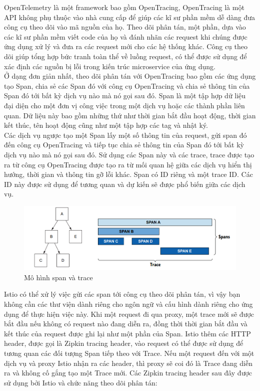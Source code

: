 \documentclass[14pt,a4paper]{book}
\begin{document}
{{		OpenTelemetry là một framework bao gồm OpenTracing, OpenTracing là một API không phụ thuộc vào nhà cung cấp để giúp các kĩ sư phần mềm dễ dàng đưa công cụ theo dõi vào mã nguồn của họ. Theo dõi phân tán, một phần, dựa vào các kĩ sư phần mềm viết code của họ và đánh nhãn các request khi chúng được ứng dụng xử lý và đưa ra các request mới cho các hệ thống khác. Công cụ theo dõi giúp tổng hợp bức tranh toàn thể về luồng request, có thể được sử dụng để xác định các nguồn bị lỗi trong kiến trúc microservice của ứng dụng.\\
		
		Ở dạng đơn giản nhất, theo dõi phân tán với OpenTracing bao gồm các ứng dụng tạo Span, chia sẻ các Span đó với công cụ OpenTracing và chia sẻ thông tin của Span đó tới bất kỳ dịch vụ nào mà nó gọi sau đó. Span là một tập hợp dữ liệu đại diện cho một đơn vị công việc trong một dịch vụ hoặc các thành phần liên quan. Dữ liệu này bao gồm những thứ như thời gian bắt đầu hoạt động, thời gian kết thúc, tên hoạt động cũng như một tập hợp các tag và nhật ký.\\
		
		Các dịch vụ ngược tạo một Span lấy một số thông tin của request, gửi span đó đến công cụ OpenTracing và tiếp tục chia sẻ thông tin của Span đó tới bất kỳ dịch vụ nào mà nó gọi sau đó. Sử dụng các Span này và các trace, trace được tạo ra từ công cụ OpenTracing được tạo ra từ mối quan hệ giữa các dịch vụ hiển thị hướng, thời gian và thông tin gỡ lỗi khác. Span có ID riêng và một trace ID. Các ID này được sử dụng để tương quan và dự kiến sẽ được phổ biến giữa các dịch vụ.
		
		\begin{figure}[h]
			\centering
			\includegraphics[width=1\linewidth]{Pics/2.3.2-p2}
			\caption{Mô hình span và trace}
			\label{fig:2}
		\end{figure}
		
		Istio có thể xử lý việc gửi các span tới công cụ theo dõi phân tán, vì vậy bạn không cần các thư viện dành riêng cho ngôn ngữ và cấu hình dành riêng cho ứng dụng để thực hiện việc này. Khi một request đi qua proxy, một trace mới sẽ được bắt đầu nếu không có request nào đang diễn ra, đồng thời thời gian bắt đầu và kết thúc của request được ghi lại như một phần của Span. Istio thêm các HTTP header, được gọi là Zipkin tracing header, vào request có thể được sử dụng để tương quan các đối tượng Span tiếp theo với Trace. Nếu một request đến với một dịch vụ và proxy Istio nhận ra các header, thì proxy sẽ coi đó là Trace đang diễn ra và không cố gắng tạo một Trace mới. Các Zipkin tracing header sau đây được sử dụng bởi Istio và chức năng theo dõi phân tán:
		
}}
\end{document}
